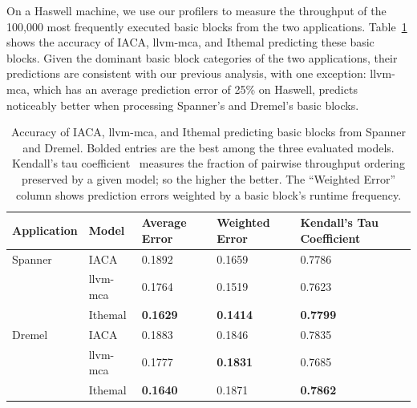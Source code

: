 On a Haswell machine, we use our profilers
to measure the throughput of the 100,000 most frequently executed  basic blocks
from the two applications. Table~\ref{tab:google-numbers} shows the accuracy
of IACA, llvm-mca, and Ithemal predicting these basic blocks.
Given the dominant basic block categories of the 
two applications,
their predictions are consistent with our previous analysis,
with one exception:
llvm-mca, which has an average prediction error of 25\% on Haswell, predicts noticeably better
when processing Spanner's and Dremel's basic blocks.

\begin{table}[h]
\begin{tabular}
{|p{}|p{}|p{}|p{}|p{}|}
\hline

\textbf{Application} & \textbf{Model} &
\textbf{Average Error} & \textbf{Weighted Error} & \textbf{Kendall's Tau Coefficient} \\
\hline

Spanner & IACA & 0.1892 & 0.1659 & 0.7786\\
    & llvm-mca & 0.1764 & 0.1519 & 0.7623\\
    & Ithemal & \textbf{0.1629} & \textbf{0.1414} & \textbf{0.7799}\\
\hline

Dremel & IACA & 0.1883 & 0.1846 & 0.7835\\
    & llvm-mca & 0.1777 & \textbf{0.1831} & 0.7685\\
    & Ithemal & \textbf{0.1640} & 0.1871 & \textbf{0.7862}\\

\hline
\end{tabular}
\\
\caption{Accuracy of IACA, llvm-mca, and Ithemal predicting basic blocks from Spanner and Dremel.
Bolded entries are the best among the three evaluated models.
Kendall's tau coefficient~\cite{kendalltau}
measures the fraction of pairwise throughput ordering preserved by a given model;
so the higher the better.
The ``Weighted Error'' column shows prediction errors weighted by a basic block's runtime frequency.}
\label{tab:google-numbers}
\end{table}